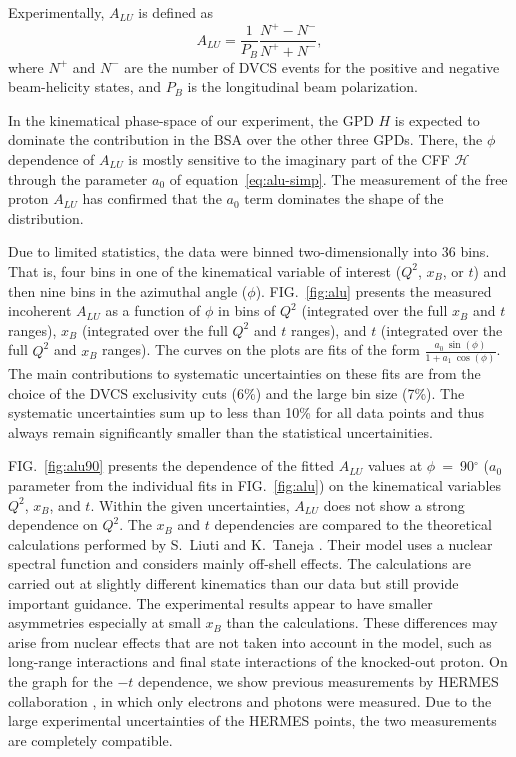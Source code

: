 \documentclass[twocolumn,nofootinbib,showpacs,prl,superscriptaddress,secnumarabic,amssymb,nobibnotes,aps,floatfix]{revtex4}
\begin{document}
Experimentally, $A_{LU}$ is defined as
\begin{equation}
A_{LU} = \frac{1}{P_{B}} \frac{N^{+} - N^{-}}{N^{+} + N^{-} },
\end{equation}
where $N^{+}$ and $N^{-}$ are the number of DVCS events for the positive and 
negative beam-helicity states, and $P_{B}$ is the longitudinal beam 
polarization.  

In the kinematical phase-space of our experiment, the GPD $H$ is
expected to dominate the contribution in the BSA over the other three GPDs.  
There, the $\phi$ dependence of $A_{LU}$ is mostly sensitive to the  imaginary 
part of the CFF $\mathcal{H}$ through the parameter $a_0$ of 
equation~\ref{eq:alu-simp}. The measurement of the free proton $A_{LU}$ 
\cite{Girod:2007aa} has confirmed that the $a_0$ term dominates the shape of 
the distribution.  

Due to limited statistics, the data were binned two-dimensionally into 36 bins.  
That is, four bins in one of the kinematical variable of interest ($Q^{2}$, 
$x_{B}$, or $t$) and then nine bins in the azimuthal angle ($\phi$).   
FIG.~\ref{fig:alu} presents the measured incoherent $A_{LU}$ as a function of 
$\phi$ in bins of $Q^{2}$ (integrated over the full $x_{B}$ and $t$ ranges), 
$x_{B}$ (integrated over the full $Q^{2}$ and $t$ ranges), and $t$ (integrated 
over the full $Q^{2}$ and $x_{B}$ ranges). The curves on the plots are fits of 
the form $\frac{a_{0}~\sin(\phi)}{1+ a_{1}~\cos(\phi)}$.  The main 
contributions to systematic uncertainties on these fits are from the choice of 
the DVCS exclusivity cuts (6\%) and the large bin size (7\%). The systematic 
uncertainties sum up to less than 10\% for all data points and thus always 
remain significantly smaller than the statistical uncertainities.


FIG.~\ref{fig:alu90} presents the dependence of the fitted $A_{LU}$ values at 
$\phi$~=~90$^{\circ}$ ($a_{0}$ parameter from the individual fits in 
FIG.~\ref{fig:alu}) on the kinematical variables $Q^2$, $x_{B}$, and $t$.  
Within the given uncertainties, $A_{LU}$ does not show a strong dependence on 
$Q^2$.  The $x_{B}$ and $t$ dependencies are compared to the theoretical 
calculations performed by S.~Liuti and K.~Taneja \cite{simonetta_2}. Their 
model uses a nuclear spectral function and considers mainly off-shell effects.  
The calculations are carried out at slightly different kinematics than our data 
but still provide important guidance. The experimental results appear to have 
smaller asymmetries especially at small $x_{B}$ than the calculations. These 
differences may arise from nuclear effects that are not taken into account in 
the model, such as long-range interactions and final state interactions of the 
knocked-out proton. On the graph for the $-t$ dependence, we show previous 
measurements by HERMES collaboration \cite{Airapetian:2009cga}, in which only 
electrons and photons were measured. Due to the large experimental 
uncertainties of the HERMES points, the two measurements are completely 
compatible. 
\end{document}
